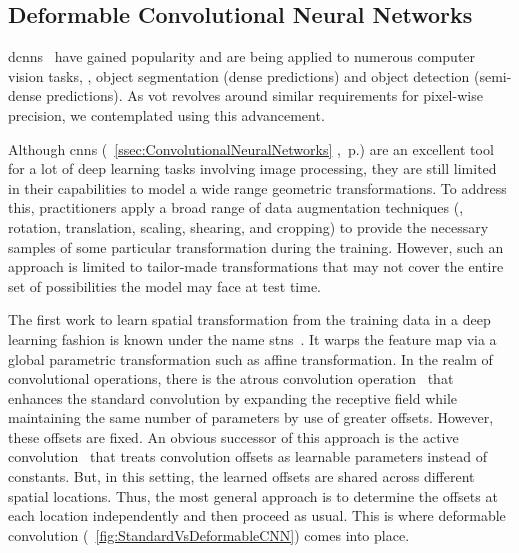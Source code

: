 \subsection{Deformable Convolutional Neural Networks}
\label{ssec:DeformableCNNs}

\glspl{dcnn}~\cite{dai2017dcnn} have gained popularity and are being applied to numerous computer vision tasks, \egtext{}, object segmentation (dense predictions) and object detection (semi-dense predictions). As \gls{vot} revolves around similar requirements for pixel-wise precision, we contemplated using this advancement.

Although \glspl{cnn} (\sectiontext{}~\ref{ssec:ConvolutionalNeuralNetworks} ,~p.\pageref{ssec:ConvolutionalNeuralNetworks}) are an excellent tool for a lot of deep learning tasks involving image processing, they are still limited in their capabilities to model a wide range geometric transformations. To address this, practitioners apply a broad range of data augmentation techniques (\egtext{}, rotation, translation, scaling, shearing, and cropping) to provide the necessary samples of some particular transformation during the training. However, such an approach is limited to tailor-made transformations that may not cover the entire set of possibilities the model may face at test time.

The first work to learn spatial transformation from the training data in a deep learning fashion is known under the name \glspl{stn}~\cite{jaderberg2016stn}. It warps the feature map via a global parametric transformation such as affine transformation. In the realm of convolutional operations, there is the atrous convolution operation~\cite{holschneider1990atrousconv} that enhances the standard convolution by expanding the receptive field while maintaining the same number of parameters by use of greater offsets. However, these offsets are fixed. An obvious successor of this approach is the active convolution~\cite{jeon2017activeconv} that treats convolution offsets as learnable parameters instead of constants. But, in this setting, the learned offsets are shared across different spatial locations. Thus, the most general approach is to determine the offsets at each location independently and then proceed as usual. This is where deformable convolution (\figtext{}~\ref{fig:StandardVsDeformableCNN}) comes into place.

